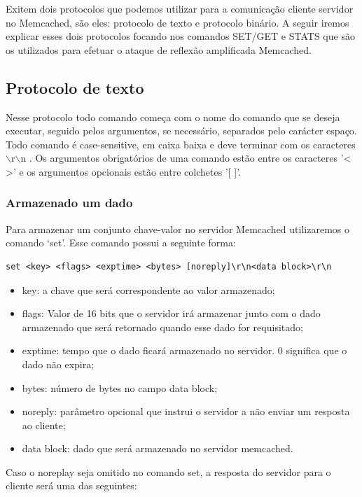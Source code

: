 Exitem dois protocolos que podemos utilizar para a comunicação cliente servidor no Memcached, são eles: protocolo de texto e protocolo binário. A seguir iremos explicar esses dois protocolos focando nos comandos SET/GET e STATS que são os utilizados para efetuar o ataque de reflexão amplificada Memcached.

\subsection{Protocolo de texto}

Nesse protocolo todo comando começa com o nome do comando que se deseja executar, seguido pelos argumentos, se necessário, separados pelo carácter espaço. Todo comando é case-sensitive, em caixa baixa e deve terminar com os caracteres $\backslash$r$\backslash$n \cite{MemcachedTextProtocol}. Os argumentos obrigatórios de uma comando estão entre os caracteres '< >' e os argumentos opcionais estão entre colchetes '[ ]'.

\subsubsection{Armazenado um dado}
Para armazenar um conjunto chave-valor no servidor Memcached utilizaremos o comando `set'. Esse comando possui a seguinte forma:

\begin{lstlisting}
set <key> <flags> <exptime> <bytes> [noreply]\r\n<data block>\r\n
\end{lstlisting}

\begin{itemize}
\item key: a chave que será correspondente ao valor armazenado;
\item flags: Valor de 16 bits que o servidor irá armazenar junto com o dado armazenado que será retornado quando esse dado for requisitado;
\item exptime: tempo que o dado ficará armazenado no servidor. 0 significa que o dado não expira;
\item bytes: número de bytes no campo data block;
\item noreply: parâmetro opcional que instrui o servidor a não enviar um resposta ao cliente;
\item data block: dado que será armazenado no servidor memcached.
\end{itemize}

Caso o noreplay seja omitido no comando set, a resposta do servidor para o cliente será uma das seguintes:

